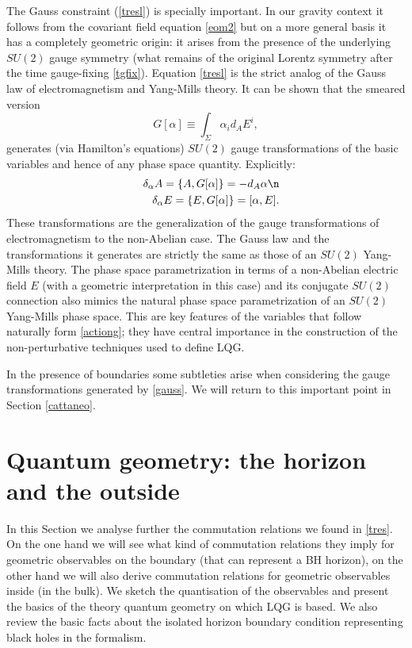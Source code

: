 \documentclass[aps, nofootinbib,superscriptaddress,12pt]{revtex4-2}
\def\be{\begin{equation}}
\def\ee{\end{equation}}
\def\ba{\begin{eqnarray}}
\def\ea{\end{eqnarray}}
\begin{document}
The Gauss constraint (\ref{tresl}) is specially important. In our gravity context it follows from the covariant field equation \eqref{eom2} but on a more general basis it has a completely geometric origin: it arises from the presence of the underlying $SU(2)$ gauge symmetry (what remains of the original Lorentz symmetry after the time gauge-fixing \eqref{tgfix}).  Equation \eqref{tresl} is the strict analog of the Gauss law of electromagnetism and Yang-Mills theory.  It can be shown  that the smeared version
\be\label{gauss}
G[\alpha]\equiv\int_{\Sigma} \alpha_i d_A E^i, 
\ee
generates (via Hamilton's equations) $SU(2)$ gauge transformations of the basic variables and hence of any phase space quantity.
Explicitly:
\ba\label{transfi}
&& \delta_{\alpha} A=\{A,G[\alpha]\}=-d_A\alpha \n \\
&& \delta_{\alpha} E=\{E,G[\alpha]\}=[\alpha,E].
\ea 
These transformations are the generalization of the gauge transformations of electromagnetism to the non-Abelian case.
The Gauss law and the transformations it generates  are strictly the same as those of an $SU(2)$ Yang-Mills theory. The phase space parametrization in terms of a non-Abelian electric field $E$ (with a geometric interpretation in this case) and its conjugate $SU(2)$ connection also mimics the natural phase space parametrization of an $SU(2)$ Yang-Mills phase space. This are key features of the variables that follow naturally form \eqref{actiong}; they have central importance in the construction of the non-perturbative techniques used to define LQG.

In the presence of boundaries some subtleties arise when considering the gauge 
transformations generated by \eqref{gauss}. We will return to this important point in Section \ref{cattaneo}.


\section{Quantum geometry: the horizon and the outside}\label{qg}

In this Section we analyse further the commutation relations we found in \eqref{tres}. On the one hand we will see what kind of commutation relations they imply for geometric observables on the boundary (that can represent a BH horizon), on the other hand we will also derive commutation relations for geometric observables inside (in the bulk). We sketch the quantisation of the observables and present the basics of the theory quantum geometry on which LQG is based. 
We also review the basic facts about the isolated horizon boundary condition \cite{Ashtekar:2000sz} representing black holes in the formalism. 
\end{document}
